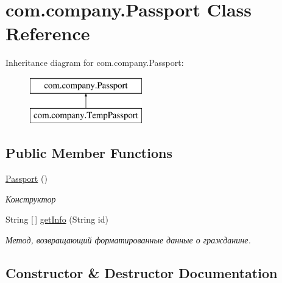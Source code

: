 \hypertarget{classcom_1_1company_1_1Passport}{}\section{com.\+company.\+Passport Class Reference}
\label{classcom_1_1company_1_1Passport}
Inheritance diagram for com.\+company.\+Passport\+:\begin{figure}[H]
\begin{center}
\leavevmode
\includegraphics[height=2.000000cm]{classcom_1_1company_1_1Passport}
\end{center}
\end{figure}
\subsection*{Public Member Functions}
\begin{DoxyCompactItemize}
\item 
\mbox{\hyperlink{classcom_1_1company_1_1Passport_ae896b9cc83f86a204e4908e90b760a6e}{Passport}} ()
\begin{DoxyCompactList}\small\item\em Конструктор \end{DoxyCompactList}\item 
String \mbox{[}$\,$\mbox{]} \mbox{\hyperlink{classcom_1_1company_1_1Passport_a13c307f5067950667804b5d2d1ecc5bf}{get\+Info}} (String id)
\begin{DoxyCompactList}\small\item\em Метод, возвращающий форматированные данные о гражданине. \end{DoxyCompactList}\end{DoxyCompactItemize}


\subsection{Constructor \& Destructor Documentation}
\mbox{\label{classcom_1_1company_1_1Passport_ae896b9cc83f86a204e4908e90b760a6e}} 
